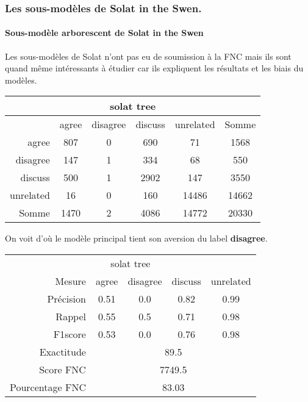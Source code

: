 \subsubsection{Les sous-modèles de Solat in the Swen.}
\paragraph{Sous-modèle arborescent de Solat in the Swen}
Les sous-modèles de Solat n'ont pas eu de soumission à la FNC mais ils sont quand même intéressants à étudier car ils expliquent les résultats et les biais du modèles.

\begin{center}
 \begin{tabular}{ r | c c c c | c }
  \multicolumn{6}{c}{solat tree}\\
  \hline
            & agree & disagree & discuss & unrelated & Somme \\
  \hline
  agree     & 807   & 0        & 690     & 71        & 1568  \\
  disagree  & 147   & 1        & 334     & 68        & 550   \\
  discuss   & 500   & 1        & 2902    & 147       & 3550  \\
  unrelated & 16    & 0        & 160     & 14486     & 14662 \\
  \hline
  Somme     & 1470  & 2        & 4086    & 14772     & 20330 \\
 \end{tabular}
\end{center}



On voit d'où le modèle principal tient son aversion du label \textbf{disagree}.

\begin{center}
 \begin{tabular}{ r | c c c c }
  \multicolumn{5}{c}{solat tree}\\
  Mesure     & agree & disagree & discuss & unrelated \\
  \hline
  Précision & 0.51  & 0.0      & 0.82    & 0.99      \\
  Rappel     & 0.55  & 0.5      & 0.71    & 0.98      \\
  F1score    & 0.53  & 0.0      & 0.76    & 0.98      \\
  \hline
  \hline
  Exactitude & \multicolumn{4}{c}{89.5}\\
  Score FNC & \multicolumn{4}{c}{7749.5}\\
  Pourcentage FNC & \multicolumn{4}{c}{83.03}\\
 \end{tabular}
\end{center}


